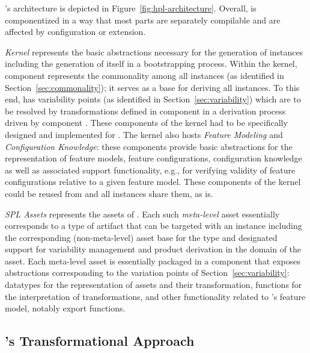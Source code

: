 \hpl's architecture is depicted in Figure~\ref{fig:hpl-architecture}. Overall, \hpl{} is componentized in a way that most parts are separately compilable and are affected by configuration or extension.

\emph{Kernel} represents the basic abstractions necessary for the generation of \hpl{} instances including the generation of \hpl{} itself in a bootstrapping process. Within the kernel, component \hpbase{} represents the commonality among all \hpl{} instances (as identified in Section~\ref{sec:commonality}); it serves as a base for deriving all \hpl{} instances. To this end, \hpbase{} has variability points (as identified in Section~\ref{sec:variability}) which are to be resolved by transformations defined in component \hpsplasset{} in a derivation process driven by component \hpproduct. These components of the kernel had to be specifically designed and implemented for \hpl. The kernel also hosts \emph{Feature Modeling} and \emph{Configuration Knowledge}: these components provide
basic abstractions for the representation of feature models, feature configurations, configuration knowledge as well as associated support functionality, e.g., for verifying validity of feature configurations relative to a given feature model. These components of the kernel could be reused from \hp{} and all \hpl{} instances share them, as is.

\textit{SPL Assets} represents the assets of \hpl. Each such \emph{meta-level} asset essentially corresponds to a type of artifact that can be targeted with an \hpl{} instance including the corresponding (non-meta-level) asset base for the type and designated support for variability management and product derivation in the domain of the asset. Each meta-level asset is essentially packaged in a component that exposes abstractions corresponding to the variation points of Section~\ref{sec:variability}: datatypes for the representation of assets and their transformation, functions for the interpretation of transformations, and other functionality related to \hpl's feature model, notably export functions.


\subsection{\hpl's Transformational Approach} 
\label{sec:hpl-transformation}

